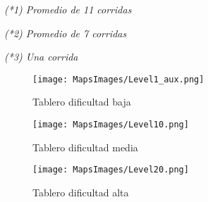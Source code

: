 \documentclass[10pt,journal,compsoc]{IEEEtran}
\begin{document}
\textit{(*1) Promedio de 11 corridas}
\par\textit{(*2) Promedio de 7 corridas}
\par\textit{(*3) Una corrida}

\begin{figure*}[hp]
\centering
\texttt{[image: MapsImages/Level1\_aux.png]}
\caption{Tablero dificultad baja}
\label{board1}
\end{figure*}

\begin{figure*}[hp]
\centering
\texttt{[image: MapsImages/Level10.png]}
\caption{Tablero dificultad media}
\label{board2}
\end{figure*}

\begin{figure*}[hp]
\centering
\texttt{[image: MapsImages/Level20.png]}
\caption{Tablero dificultad alta}
\label{board3}
\end{figure*}
\end{document}
